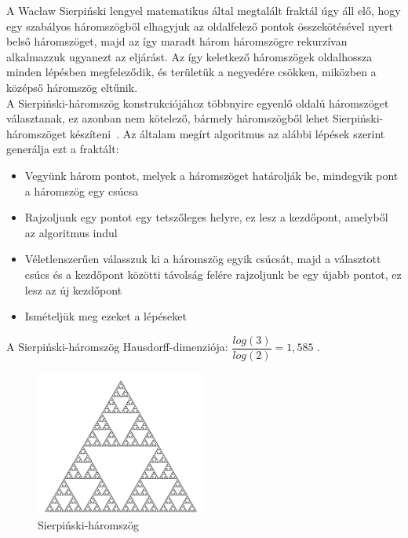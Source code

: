 A Wacław Sierpiński lengyel matematikus által megtalált fraktál úgy áll elő, hogy egy szabályos háromszögből elhagyjuk az oldalfelező pontok összekötésével nyert belső háromszöget, majd az így maradt három háromszögre rekurzívan alkalmazzuk ugyanezt az eljárást. Az így keletkező háromszögek oldalhossza minden lépésben megfeleződik, és területük a negyedére csökken, miközben a középső háromszög eltűnik.\\
A Sierpiński-háromszög konstrukciójához többnyire egyenlő oldalú háromszöget választanak, ez azonban nem kötelező, bármely háromszögből lehet Sierpiński-háromszöget készíteni~\cite{sierp-triangle}.
Az általam megírt algoritmus az alábbi lépések szerint generálja ezt a fraktált:
\begin{itemize}
\item Vegyünk három pontot, melyek a háromszöget határolják be, mindegyik pont a háromszög egy csúcsa
\item Rajzoljunk egy pontot egy tetszőleges helyre, ez lesz a kezdőpont, amelyből az algoritmus indul
\item Véletlenszerűen válasszuk ki a háromszög egyik csúcsát, majd a választott csúcs és a kezdőpont közötti távolság felére rajzoljunk be egy újabb pontot, ez lesz az új kezdőpont
\item Ismételjük meg ezeket a lépéseket
\end{itemize}
A Sierpiński-háromszög Hausdorff-dimenziója: $\dfrac{log(3)}{log(2)} = 1,585$ \cite{sierp-triangle-wiki}.
\clearpage
\begin{figure}[ht]
\begin{center}
	\includegraphics[width=0.5\textwidth]{img/SierpinskiTriangle}
	\caption[labelInTOC]{Sierpiński-háromszög}
\end{center}
\end{figure}
